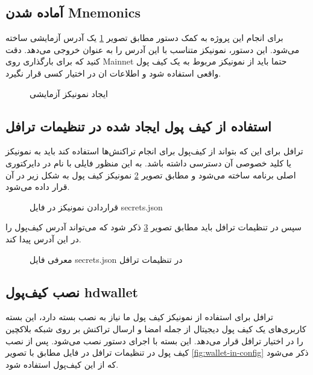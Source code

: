 \subsection{آماده شدن \gls{Mnemonics}}
برای انجام این پروژه به کمک دستور
مطابق تصویر
\ref{fig:mnemonics}
یک آدرس آزمایشی ساخته می‌شود.
این دستور، نمونیکز متناسب با این آدرس را به عنوان خروجی می‌دهد. دقت کنید که برای بارگذاری روی
\gls{Mainnet}
حتما باید از نمونیکز مربوط به یک کیف پول واقعی استفاده شود و اطلاعات ان در اختیار کسی قرار نگیرد.

\begin{figure}
\centerline{}
\caption{ایجاد نمونیکز آزمایشی}
\label{fig:mnemonics}
\end{figure}


\subsection{استفاده از کیف پول ایجاد شده در تنظیمات ترافل}
ترافل برای این که بتواند از کیف‌پول برای انجام تراکنش‌ها استفاده کند باید به نمونیکز یا کلید خصوصی آن دسترسی داشته باشد.
به این منظور فایلی با نام
در دایرکتوری اصلی برنامه ساخته می‌شود و مطابق تصویر
\ref{fig:mnemonics-in-secrets}
نمونیکز کیف پول به شکل زیر در آن قرار داده می‌شود.

\begin{figure}
\centerline{}
\caption{قراردادن نمونیکز در فایل secrets.json}
\label{fig:mnemonics-in-secrets}
\end{figure}

سپس در تنظیمات ترافل باید مطابق تصویر
\ref{fig:secrets-in-config}
ذکر شود که می‌تواند آدرس کیف‌پول را در این آدرس پیدا کند.

\begin{figure}
\centerline{}
\caption{معرفی فایل secrets.json در تنظیمات ترافل}
\label{fig:secrets-in-config}
\end{figure}


\subsection{نصب کیف‌پول hdwallet}
ترافل برای استفاده از نمونیکز کیف پول ما نیاز به نصب بسته
دارد،
این بسته کاربری‌های یک کیف پول دیجیتال از جمله امضا و ارسال تراکنش بر روی شبکه بلاکچین را در اختیار ترافل قرار می‌دهد.
این بسته با اجرای دستور
نصب می‌شود.  پس از نصب کیف پول در تنظیمات ترافل در فایل
مطابق با تصویر
\ref{fig:wallet-in-config}
ذکر می‌شود که از این کیف‌پول استفاده شود.

